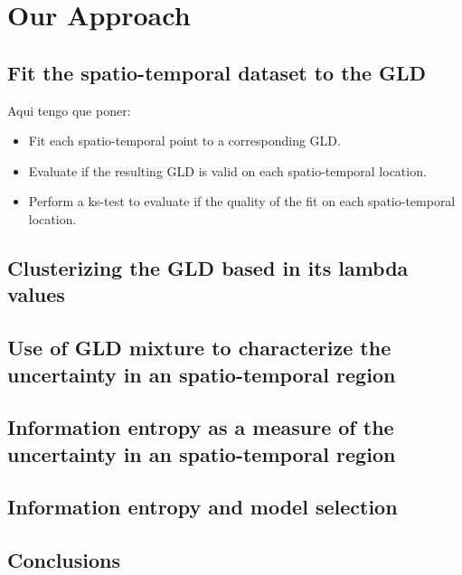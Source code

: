 \chapter{Our Approach}\label{our_approach}

\section{Fit the spatio-temporal dataset to the GLD}

Aqui tengo que poner:
\begin{itemize}
\item Fit each spatio-temporal point to a corresponding GLD.
\item Evaluate if the resulting GLD is valid on each spatio-temporal location.
\item Perform a ks-test to evaluate if the quality of the fit on each spatio-temporal location.
\end{itemize}

\section{Clusterizing the GLD based in its lambda values}

\section{Use of GLD mixture to characterize the uncertainty in an spatio-temporal region}

\section{Information entropy as a measure of the uncertainty in an spatio-temporal region}

\section{Information entropy and model selection}

\section{Conclusions}